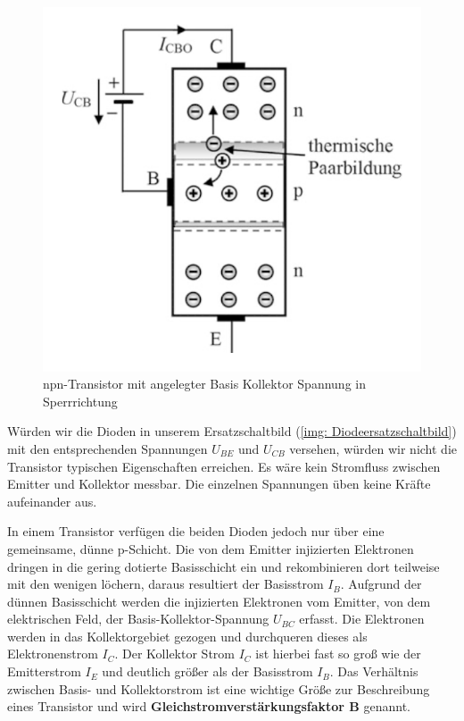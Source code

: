 \begin{figure}[!htb]
	\centering
	\includegraphics[scale=0.8]{images/UCEUebergang.png} 
	\caption{npn-Transistor mit angelegter Basis Kollektor Spannung in Sperrrichtung\cite{Stiny2018}}
	\label{img: UBC}		
\end{figure}	

Würden wir die Dioden in unserem Ersatzschaltbild (\ref{img: Diodeersatzschaltbild}) mit den entsprechenden Spannungen $U_{BE}$ und $U_{CB}$ versehen, würden wir nicht die Transistor typischen Eigenschaften erreichen. Es wäre kein Stromfluss zwischen Emitter und Kollektor messbar. Die einzelnen Spannungen üben keine Kräfte aufeinander aus.


In einem Transistor verfügen die beiden Dioden jedoch nur über eine gemeinsame, dünne p-Schicht. Die von dem Emitter injizierten Elektronen dringen in die gering dotierte Basisschicht ein und rekombinieren  dort teilweise mit den wenigen löchern, daraus resultiert der Basisstrom $I_B$. Aufgrund der dünnen Basisschicht werden die injizierten Elektronen vom Emitter, von dem elektrischen Feld, der Basis-Kollektor-Spannung $U_{BC}$ erfasst. Die Elektronen werden in das Kollektorgebiet gezogen und durchqueren dieses als Elektronenstrom $I_C$. Der Kollektor Strom $I_C$ ist hierbei fast so groß wie der Emitterstrom $I_E$ und deutlich größer als der Basisstrom $I_B$. Das Verhältnis zwischen Basis- und Kollektorstrom ist eine wichtige Größe zur Beschreibung eines Transistor und wird \textbf{Gleichstromverstärkungsfaktor B} genannt. 

